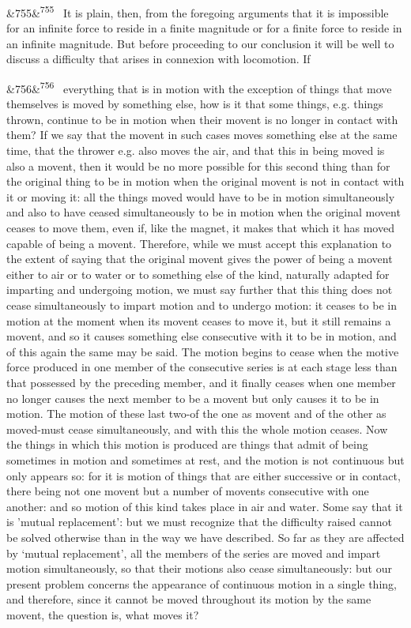 \documentclass[12pt]{article}
\newcommand{\para}[1][]{\par\noindent\ifx&#1&\else\textsuperscript{\footnotesize #1}~\fi}
\begin{document}
\para[755] It is plain, then, from the foregoing arguments that it is impossible for an infinite force to reside in a finite magnitude or for a finite force to reside in an infinite magnitude. But before proceeding to our conclusion it will be well to discuss a difficulty that arises in connexion with locomotion. If

\para[756] everything that is in motion with the exception of things that move themselves is moved by something else, how is it that some things, e.g. things thrown, continue to be in motion when their movent is no longer in contact with them? If we say that the movent in such cases moves something else at the same time, that the thrower e.g. also moves the air, and that this in being moved is also a movent, then it would be no more possible for this second thing than for the original thing to be in motion when the original movent is not in contact with it or moving it: all the things moved would have to be in motion simultaneously and also to have ceased simultaneously to be in motion when the original movent ceases to move them, even if, like the magnet, it makes that which it has moved capable of being a movent. Therefore, while we must accept this explanation to the extent of saying that the original movent gives the power of being a movent either to air or to water or to something else of the kind, naturally adapted for imparting and undergoing motion, we must say further that this thing does not cease simultaneously to impart motion and to undergo motion: it ceases to be in motion at the moment when its movent ceases to move it, but it still remains a movent, and so it causes something else consecutive with it to be in motion, and of this again the same may be said. The motion begins to cease when the motive force produced in one member of the consecutive series is at each stage less than that possessed by the preceding member, and it finally ceases when one member no longer causes the next member to be a movent but only causes it to be in motion. The motion of these last two-of the one as movent and of the other as moved-must cease simultaneously, and with this the whole motion ceases. Now the things in which this motion is produced are things that admit of being sometimes in motion and sometimes at rest, and the motion is not continuous but only appears so: for it is motion of things that are either successive or in contact, there being not one movent but a number of movents consecutive with one another: and so motion of this kind takes place in air and water. Some say that it is 'mutual replacement’: but we must recognize that the difficulty raised cannot be solved otherwise than in the way we have described. So far as they are affected by ‘mutual replacement’, all the members of the series are moved and impart motion simultaneously, so that their motions also cease simultaneously: but our present problem concerns the appearance of continuous motion in a single thing, and therefore, since it cannot be moved throughout its motion by the same movent, the question is, what moves it?
\end{document}
